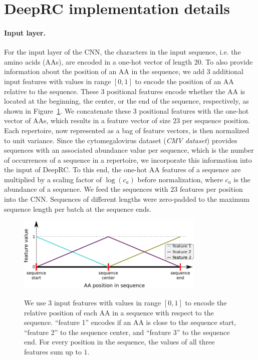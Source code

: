 \documentclass[oneside]{book}
\begin{document}
\section{DeepRC implementation details}
\label{sec:deeprc_details}
\label{sec:deeprc_implementation_details}
\paragraph{Input layer.} For the input layer of the CNN, 
the characters in the input sequence, i.e. the amino acids (AAs),
are encoded in a one-hot vector of length $20$.
To also provide information about the position of an AA in the sequence, we add 
$3$ additional input features with values in range $[0, 1]$ to encode the position 
of an AA relative to the sequence.
These $3$ positional features encode whether the AA is located at the beginning, 
the center, or the end of the sequence, respectively, as shown in 
Figure~\ref{fig:positional_encoding}.
We concatenate these $3$ positional features with the one-hot vector of AAs,
which results in a feature vector of size $23$ 
per sequence position.
Each repertoire, now represented as a bag of feature vectors, 
is then normalized to %
unit variance.
Since the cytomegalovirus dataset (\emph{CMV dataset}) provides sequences with an associated 
abundance value per sequence,
which is the number of occurrences of a sequence in a repertoire,
we incorporate this information into the input of DeepRC.
To this end, the one-hot AA features of a sequence are 
multiplied by a scaling factor of $\log(c_a)$
before normalization,
where $c_a$ is the abundance of a sequence.
We feed the sequences with $23$ features per position into the CNN.
Sequences of different lengths were zero-padded to the maximum sequence length
per batch at the sequence ends.
%


\begin{figure}[htp]
    \begin{center}
    \includegraphics[width=0.8\textwidth]{figures/position_encoding.pdf}\\
   \caption[Position encoding]{We use 3 input features with values in range $[0,1]$ to encode the relative position of each AA in a sequence with respect to the sequence.
   ``feature 1'' encodes if an AA is close to the sequence start,
   ``feature 2'' to the sequence center, and 
   ``feature 3'' to the sequence end.
   For every position in the sequence, the values of all three features sum up to $1$.
   \label{fig:positional_encoding}}
   \end{center}
\end{figure}
\end{document}
